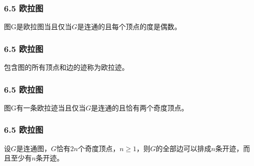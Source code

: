 \documentclass{beamer}
\begin{document}
\begin{CJK}{UTF8}{gbsn}
\begin{frame}
\end{frame}


\begin{frame}
  \frametitle{6.5 欧拉图}
  \begin{theorem6.5.1}
    图G是欧拉图当且仅当$G$是连通的且每个顶点的度是偶数。
  \end{theorem6.5.1}

\end{frame}

\begin{frame}
  \frametitle{6.5 欧拉图}
  \begin{definition6.5.2}
    包含图的所有顶点和边的迹称为欧拉迹。
  \end{definition6.5.2}

\end{frame}

\begin{frame}
  \frametitle{6.5 欧拉图}
  \begin{theorem6.5.2}
    图G有一条欧拉迹当且仅当$G$是连通的且恰有两个奇度顶点。
  \end{theorem6.5.2}

\end{frame}


\begin{frame}
  \frametitle{6.5 欧拉图}
  \begin{theorem6.5.3}
    设$G$是连通图，$G$恰有$2n$个奇度顶点，$n \geq 1$，则$G$的全部边可以排成$n$条开迹，而且至少有$n$条开迹。
  \end{theorem6.5.3}

\end{frame}



\end{CJK}
\end{document}
